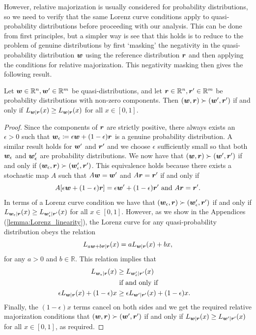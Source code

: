 \documentclass[pra,
aps,
twocolumn,
superscriptaddress,
groupedaddress,
nofootinbib,
reprint
]{revtex4-1}
\begin{document}
However, relative majorization is usually considered for probability distributions, so we need to verify that the same Lorenz curve conditions apply to quasi-probability distributions before proceeding with our analysis. This can be done from first principles, but a simpler way is see that this holds is to reduce to the problem of genuine distributions by first `masking' the negativity in the quasi-probability distribution $\boldsymbol{w}$ using the reference distribution $\boldsymbol{r}$ and then applying the conditions for relative majorization. This negativity masking then gives the following result.

\begin{lemma} Let $\boldsymbol{w} \in \mathbb{R}^n,\boldsymbol{w}'\in \mathbb{R}^m$ be quasi-distributions, and let $\boldsymbol{r} \in \mathbb{R}^n, \boldsymbol{r}' \in \mathbb{R}^m$ be probability distributions with non-zero components. Then $(\boldsymbol{w}, \boldsymbol{r}) \succ (\boldsymbol{w}', \boldsymbol{r}')$ if and only if $L_{\boldsymbol{w}|\boldsymbol{r}}(x) \ge L_{\boldsymbol{w} |\boldsymbol{r}}(x)$ for all $x \in [0,1]$.
\end{lemma}
 
 \begin{proof}
Since the components of $\boldsymbol{r}$ are strictly positive, there always exists an $\epsilon >0$ such that $\boldsymbol{w}_\epsilon \coloneqq \epsilon \boldsymbol{w} + (1-\epsilon) \boldsymbol{r}$ is a genuine probability distribution. A similar result holds for $\boldsymbol{w}'$ and $\boldsymbol{r}'$ and we choose $\epsilon$ sufficiently small so that both $\boldsymbol{w}_\epsilon$ and $\boldsymbol{w}_\epsilon'$ are probability distributions. We now have that $(\boldsymbol{w} , \boldsymbol{r}) \succ (\boldsymbol{w}', \boldsymbol{r}')$ if and only if $(\boldsymbol{w}_\epsilon , \boldsymbol{r}) \succ (\boldsymbol{w}_\epsilon', \boldsymbol{r}')$. This equivalence holds because there exists a stochastic map $A$ such that $A \boldsymbol{w} = \boldsymbol{w}'$ and $A \boldsymbol{r} = \boldsymbol{r}'$ if and only if 
\begin{equation}
A[\epsilon \boldsymbol{w} + (1-\epsilon) \boldsymbol{r}] = \epsilon \boldsymbol{w}' + (1-\epsilon) \boldsymbol{r}'\mbox{ and } A\boldsymbol{r} = \boldsymbol{r}'.
\end{equation}
In terms of a Lorenz curve condition we have that $(\boldsymbol{w}_\epsilon , \boldsymbol{r}) \succ (\boldsymbol{w}_\epsilon', \boldsymbol{r}')$ if and only if $L_{\boldsymbol{w}_\epsilon |\boldsymbol{r}} (x) \ge L_{\boldsymbol{w}'_\epsilon |\boldsymbol{r}'} (x)$ for all $x \in [0,1]$. 
However, as we show in the Appendices (\cref{lemma:Lorenz_linearity}), the Lorenz curve for any quasi-probability distribution obeys the relation
\begin{equation}
L_{a \boldsymbol{w} + b \boldsymbol{r} | \boldsymbol{r}} (x) = a L_{\boldsymbol{w}|\boldsymbol{r}} (x) + bx,
\end{equation}
for any $a >0$ and $b \in \mathbb{R}$. This relation implies that
\begin{align}
L_{\boldsymbol{w}_\epsilon |\boldsymbol{r}} (x) &\ge L_{\boldsymbol{w}'_\epsilon |\boldsymbol{r}'} (x) \nonumber \\ 
&\mbox{ if and only if }& \nonumber \\
\epsilon L_{\boldsymbol{w} |\boldsymbol{r}} (x) + (1-\epsilon) x &\ge \epsilon L_{\boldsymbol{w}' |\boldsymbol{r}'} (x) + (1-\epsilon) x.
\end{align}
Finally, the $(1-\epsilon)x$ terms cancel on both sides and we get the required relative majorization conditions that $(\boldsymbol{w}, \boldsymbol{r}) \succ (\boldsymbol{w}', \boldsymbol{r}')$ if and only if $L_{\boldsymbol{w} | \boldsymbol{r}} (x) \ge L_{\boldsymbol{w}' | \boldsymbol{r}'}(x)$ for all $x \in [0,1]$, as required.
\end{proof}
\end{document}
